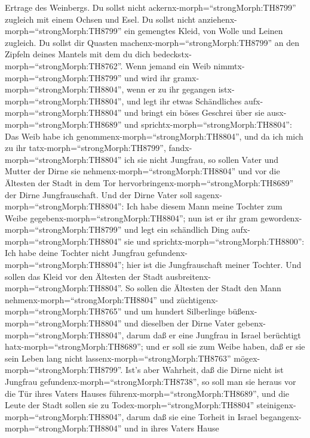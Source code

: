 Ertrage des Weinbergs.  Du sollst nicht
ackernx-morph=``strongMorph:TH8799'' zugleich mit einem Ochsen und Esel.
 Du sollst nicht anziehenx-morph=``strongMorph:TH8799'' ein
gemengtes Kleid, von Wolle und Leinen zugleich.  Du sollst
dir Quasten machenx-morph=``strongMorph:TH8799'' an den Zipfeln deines
Mantels mit dem du dich bedeckstx-morph=``strongMorph:TH8762''.
 Wenn jemand ein Weib nimmtx-morph=``strongMorph:TH8799''
und wird ihr gramx-morph=``strongMorph:TH8804'', wenn er zu ihr gegangen
istx-morph=``strongMorph:TH8804'',  und legt ihr etwas
Schändliches aufx-morph=``strongMorph:TH8804'' und bringt ein böses
Geschrei über sie ausx-morph=``strongMorph:TH8689'' und
sprichtx-morph=``strongMorph:TH8804'': Das Weib habe ich
genommenx-morph=``strongMorph:TH8804'', und da ich mich zu ihr
tatx-morph=``strongMorph:TH8799'', fandx-morph=``strongMorph:TH8804''
ich sie nicht Jungfrau,  so sollen Vater und Mutter der
Dirne sie nehmenx-morph=``strongMorph:TH8804'' und vor die Ältesten der
Stadt in dem Tor hervorbringenx-morph=``strongMorph:TH8689'' der Dirne
Jungfrauschaft.  Und der Dirne Vater soll
sagenx-morph=``strongMorph:TH8804'': Ich habe diesem Mann meine Tochter
zum Weibe gegebenx-morph=``strongMorph:TH8804''; nun ist er ihr gram
gewordenx-morph=``strongMorph:TH8799''  und legt ein
schändlich Ding aufx-morph=``strongMorph:TH8804'' sie und
sprichtx-morph=``strongMorph:TH8800'': Ich habe deine Tochter nicht
Jungfrau gefundenx-morph=``strongMorph:TH8804''; hier ist die
Jungfrauschaft meiner Tochter. Und sollen das Kleid vor den Ältesten der
Stadt ausbreitenx-morph=``strongMorph:TH8804''.  So sollen
die Ältesten der Stadt den Mann nehmenx-morph=``strongMorph:TH8804'' und
züchtigenx-morph=``strongMorph:TH8765''  und um hundert
Silberlinge büßenx-morph=``strongMorph:TH8804'' und dieselben der Dirne
Vater gebenx-morph=``strongMorph:TH8804'', darum daß er eine Jungfrau in
Israel berüchtigt hatx-morph=``strongMorph:TH8689''; und er soll sie zum
Weibe haben, daß er sie sein Leben lang nicht
lassenx-morph=``strongMorph:TH8763'' mögex-morph=``strongMorph:TH8799''.
 Ist's aber Wahrheit, daß die Dirne nicht ist Jungfrau
gefundenx-morph=``strongMorph:TH8738'',  so soll man sie
heraus vor die Tür ihres Vaters Hauses
führenx-morph=``strongMorph:TH8689'', und die Leute der Stadt sollen sie
zu Todex-morph=``strongMorph:TH8804''
steinigenx-morph=``strongMorph:TH8804'', darum daß sie eine Torheit in
Israel begangenx-morph=``strongMorph:TH8804'' und in ihres Vaters Hause
